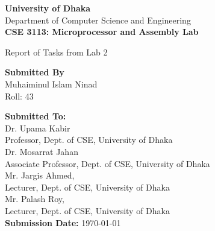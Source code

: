 \documentclass[12pt,a4paper]{article}
\begin{document}
\begin{titlepage}
    \centering
    
    \vspace*{1cm}
    {\fontsize{20}{24}\bfseries University of Dhaka}\\[0.4cm]
    {\large Department of Computer Science and Engineering}\\[1cm]
    
    \hline
    \vspace{.5cm}
    {\Large \textbf{CSE 3113: Microprocessor and Assembly Lab}\\[.5cm]}
    
    \Large{Report of Tasks from Lab 2}
    \vspace{.5cm}
    \hline
    
    \vspace{1.5cm}
    
    
    \begin{center}
        \textbf{Submitted By} \\
        Muhaiminul Islam Ninad \\
        Roll:  43
    \end{center}
    
    
    \vspace{1.5cm}
    
    {\large \textbf{Submitted To:}}\\[0.4cm]
    Dr. Upama Kabir \\
    Professor,  Dept. of CSE, University of Dhaka\\[.3cm]
    Dr. Mosarrat Jahan \\
    Associate Professor, Dept. of CSE, University of Dhaka \\[.3cm]
    Mr. Jargis Ahmed, \\
    Lecturer, Dept. of CSE, University of Dhaka\\[.3cm]
    Mr. Palash Roy, \\
    Lecturer, Dept. of CSE, University of Dhaka\\[1.3cm]
    
    {\large \textbf{Submission Date:} \today}
    
    \vfill
    
    \thispagestyle{empty}
\end{titlepage}


\newpage
\tableofcontents
\newpage
\end{document}
